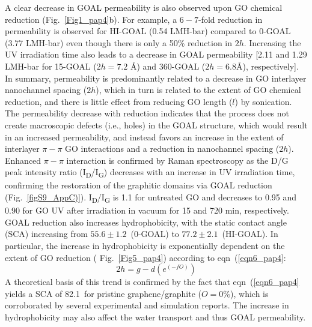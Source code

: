 A clear decrease in GOAL permeability is also observed upon GO chemical reduction (Fig.~\ref{Fig1_pap4}b). For example, a $6-7$-fold reduction in permeability is observed for HI-GOAL (0.54 LMH-bar) compared to 0-GOAL (3.77 LMH-bar) even though there is only a 50\% reduction in $2h$. Increasing the UV irradiation time also leads to a decrease in GOAL permeability [2.11 and 1.29 LMH-bar for 15-GOAL ($2h = 7.2$ {\AA}) and 360-GOAL ($2h = 6.8${\AA}), respectively]. In summary, permeability is predominantly related to a decrease in GO interlayer nanochannel spacing ($2h$), which in turn is related to the extent of GO chemical reduction, and there is little effect from reducing GO length ($l$) by sonication.\\
The permeability decrease with reduction indicates that the process does not create macroscopic defects (i.e., holes) in the GOAL structure, which would result in an increased permeability,\cite{qiu2011controllable} and instead favors an increase in the extent of interlayer $\pi-\pi$ GO interactions and a reduction in nanochannel spacing ($2h$).\cite{yang2009chemical} Enhanced $\pi-\pi$ interaction is confirmed by Raman spectroscopy as the D/G peak intensity ratio (I\textsubscript{D}/I\textsubscript{G}) decreases with an increase in UV irradiation time, confirming the restoration of the graphitic domains via GOAL reduction (Fig.~\ref{figS9_AppC)}). I\textsubscript{D}/I\textsubscript{G} is 1.1 for untreated GO and decreases to 0.95 and 0.90 for GO UV after irradiation in vacuum for 15 and 720 min, respectively. GOAL reduction also increases hydrophobicity, with the static contact angle (SCA) increasing from $55.6\pm1.2$\textdegree\ (0-GOAL) to $77.2\pm2.1$\textdegree\ (HI-GOAL).\cite{moon2010reduced,lee2013route} In particular, the increase in hydrophobicity is exponentially dependent on the extent of GO reduction ( Fig.~\ref{Fig5_pap4}) according to eqn~(\ref{eqn6_pap4}:
\begin{equation}
2h = g-d(e^{(-fO)})
 \label{eqn6_pap4}
\end{equation}
A theoretical basis of this trend is confirmed by the fact that eqn~(\ref{eqn6_pap4} yields a SCA of 82.1\textdegree\ for pristine graphene/graphite ($O = 0$\%), which is corroborated by several experimental and simulation reports.\cite{amadei2014time,kozbial2014understanding,li2013effect} The increase in hydrophobicity may also affect the water transport and thus GOAL permeability.
